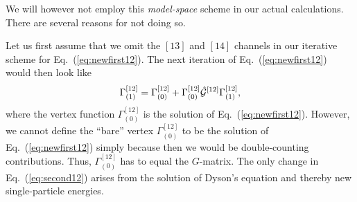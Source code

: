 We will however not employ this {\em model-space} scheme in our
actual calculations. There are several reasons for not doing so.

Let us first assume that we omit the $[13]$ and $[14]$ channels in our
iterative scheme for Eq.\ (\ref{eq:newfirst12}). 
The next iteration of Eq.\ (\ref{eq:newfirst12}) 
would then look like 
\begin{equation}
      \Gamma^{[12]}_{(1)} = 
      \Gamma_{(0)}^{[12]}+
      \Gamma_{(0)}^{[12]}
       \hat{{\cal G}}^{[12]}\Gamma^{[12]}_{(1)},
      \label{eq:second12}
\end{equation}
where the vertex function $\Gamma_{(0)}^{[12]}$ is the solution
of Eq.\ (\ref{eq:newfirst12}). However, we cannot define
the ``bare'' vertex $\Gamma_{(0)}^{[12]}$ to be the 
solution  of Eq.\ (\ref{eq:newfirst12}) simply because then we 
would be double-counting contributions.
Thus, $\Gamma_{(0)}^{[12]}$ has to equal the $G$-matrix.
The only change in Eq.\ (\ref{eq:second12}) 
arises from the solution of Dyson's equation
and thereby new single-particle energies. 

